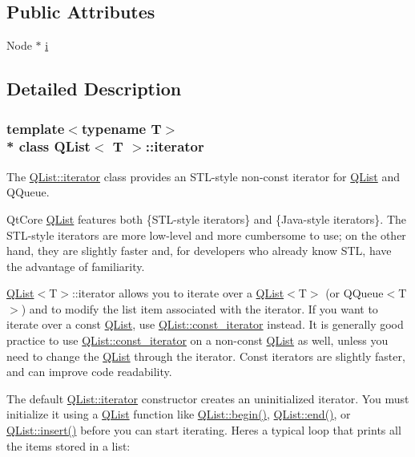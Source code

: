 \subsection*{Public Attributes}
\begin{DoxyCompactItemize}
\item 
Node $\ast$ \hyperlink{class_q_list_1_1iterator_a47610ba7fcbf05bf63ec1cccc28bce98}{i}
\end{DoxyCompactItemize}


\subsection{Detailed Description}
\subsubsection*{template$<$typename T$>$\\*
class Q\+List$<$ T $>$\+::iterator}

The \hyperlink{class_q_list_1_1iterator}{Q\+List\+::iterator} class provides an S\+T\+L-\/style non-\/const iterator for \hyperlink{class_q_list}{Q\+List} and Q\+Queue. 

Qt\+Core \hyperlink{class_q_list}{Q\+List} features both \{S\+T\+L-\/style iterators\} and \{Java-\/style iterators\}. The S\+T\+L-\/style iterators are more low-\/level and more cumbersome to use; on the other hand, they are slightly faster and, for developers who already know S\+TL, have the advantage of familiarity.

\hyperlink{class_q_list}{Q\+List}$<$T$>$\+::iterator allows you to iterate over a \hyperlink{class_q_list}{Q\+List}$<$T$>$ (or Q\+Queue$<$T$>$) and to modify the list item associated with the iterator. If you want to iterate over a const \hyperlink{class_q_list}{Q\+List}, use \hyperlink{class_q_list_1_1const__iterator}{Q\+List\+::const\+\_\+iterator} instead. It is generally good practice to use \hyperlink{class_q_list_1_1const__iterator}{Q\+List\+::const\+\_\+iterator} on a non-\/const \hyperlink{class_q_list}{Q\+List} as well, unless you need to change the \hyperlink{class_q_list}{Q\+List} through the iterator. Const iterators are slightly faster, and can improve code readability.

The default \hyperlink{class_q_list_1_1iterator}{Q\+List\+::iterator} constructor creates an uninitialized iterator. You must initialize it using a \hyperlink{class_q_list}{Q\+List} function like \hyperlink{class_q_list_a06847e57431af245c937c8cfe1c14761}{Q\+List\+::begin()}, \hyperlink{class_q_list_a5695ddeb676cedece5b061eba08c1d0c}{Q\+List\+::end()}, or \hyperlink{class_q_list_a2ae4b66fdb5875c4c55eb903fa5ca25b}{Q\+List\+::insert()} before you can start iterating. Here\textquotesingle{}s a typical loop that prints all the items stored in a list\+:


